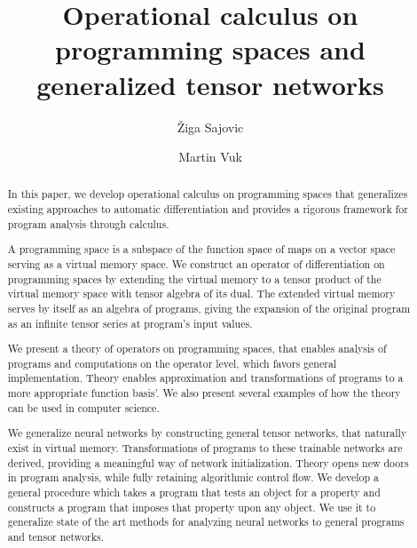 \documentclass[smallcondensed]{svjour3}
\date{}
\begin{document}
\title{Operational calculus on programming spaces and generalized tensor networks}
\author{Žiga Sajovic \and Martin Vuk}
\maketitle
\begin{abstract}
In this paper, we develop operational calculus on programming spaces that generalizes existing approaches to automatic differentiation and provides a rigorous framework for program analysis through calculus.

A programming space is a subspace of the function space of maps on a vector
space serving as a virtual memory space. We construct an operator of
differentiation on programming spaces by extending the virtual memory to a
tensor product of the virtual memory space with tensor algebra 
of its dual. The extended virtual memory serves by itself as an algebra of 
programs, giving the expansion of the original program as an infinite tensor
series at program's input values.  

We present a theory of operators on programming spaces, that enables analysis of programs
and computations on the operator level, which favors general implementation. Theory enables
approximation and transformations of programs to a more appropriate function basis'. We
also present several examples of how the theory can be used in computer science.

We generalize neural networks by constructing general tensor networks, that naturally exist in virtual memory. Transformations of programs to these trainable networks are derived, providing a meaningful way of network initialization.
Theory opens new doors in program analysis, while fully retaining algorithmic control flow. We develop a general
procedure which takes a program that tests an object for a property and
constructs a program that imposes that property upon any object. 
We use it to generalize state of the art methods for analyzing neural networks to general programs and tensor networks.

\end{abstract}
\end{document}

